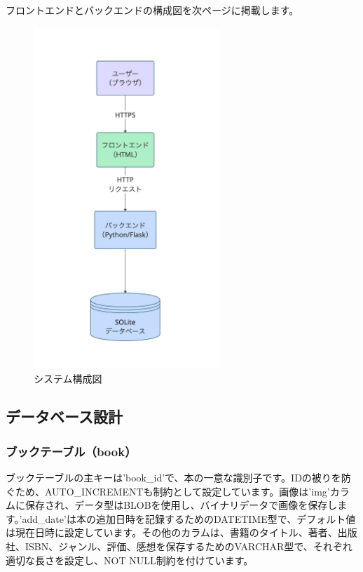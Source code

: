 \documentclass[a4paper, 11pt, titlepage]{jsarticle}
\begin{document}
フロントエンドとバックエンドの構成図を次ページに掲載します。
\clearpage
\begin{figure}[htbp]
\centering
\includegraphics[width=70mm]{systemStructure.jpg}
\caption{システム構成図}
\label{fig:func}
\end{figure}

\subsection{データベース設計}
\subsubsection{ブックテーブル（book）}

ブックテーブルの主キーは'book\_id'で、本の一意な識別子です。IDの被りを防ぐため、AUTO\_INCREMENTも制約として設定しています。画像は'img'カラムに保存され、データ型はBLOBを使用し、バイナリデータで画像を保存します。'add\_date'は本の追加日時を記録するためのDATETIME型で、デフォルト値は現在日時に設定しています。その他のカラムは、書籍のタイトル、著者、出版社、ISBN、ジャンル、評価、感想を保存するためのVARCHAR型で、それぞれ適切な長さを設定し、NOT NULL制約を付けています。
\end{document}
